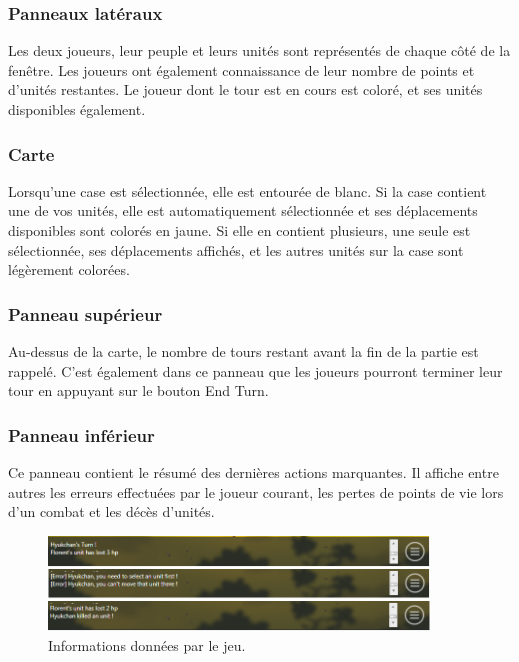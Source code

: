 \documentclass[a4paper]{article}
\begin{document}
		\subsubsection{Panneaux latéraux}
		Les deux joueurs, leur peuple et leurs unités sont représentés de chaque côté de la fenêtre. Les joueurs ont également connaissance de leur nombre de points et d'unités restantes.
		Le joueur dont le tour est en cours est coloré, et ses unités disponibles également.

		\subsubsection{Carte}
		Lorsqu'une case est sélectionnée, elle est entourée de blanc. Si la case contient une de vos unités, elle est automatiquement sélectionnée et ses déplacements disponibles sont colorés en jaune. Si elle en contient plusieurs, une seule est sélectionnée, ses déplacements affichés, et les autres unités sur la case sont légèrement colorées.

		\subsubsection{Panneau supérieur}
		Au-dessus de la carte, le nombre de tours restant avant la fin de la partie est rappelé. C'est également dans ce panneau que les joueurs pourront terminer leur tour en appuyant sur le bouton \og End Turn\fg{}.

		\subsubsection{Panneau inférieur}
		Ce panneau contient le résumé des dernières actions marquantes. Il affiche entre autres les erreurs effectuées par le joueur courant, les pertes de points de vie lors d'un combat et les décès d'unités.
		\begin{figure}[h!]
			\centering
			\includegraphics[width=0.9\textwidth]{../../IHM/info.png}
			\caption{Informations données par le jeu.}
			\label{fig:infos}
		\end{figure}
\end{document}
